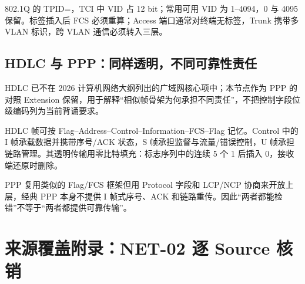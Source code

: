 \documentclass[UTF8,fontset=none,11pt,a4paper]{ctexart}
\begin{document}
802.1Q 的 TPID=，TCI 中 VID 占 12 bit；常用可用 VID 为 1--4094，0 与 4095 保留。标签插入后 FCS 必须重算；Access 端口通常对终端无标签，Trunk 携带多 VLAN 标识，跨 VLAN 通信必须转入三层。

\subsection{HDLC 与 PPP：同样透明，不同可靠性责任}

HDLC 已不在 2026 计算机网络大纲列出的广域网核心项中；本节点作为 PPP 的对照 Extension 保留，用于解释“相似帧骨架为何承担不同责任”，不把控制字段位级编码列为当前背诵要求。

HDLC 帧可按 Flag--Address--Control--Information--FCS--Flag 记忆。Control 中的 I 帧承载数据并携带序号/ACK 状态，S 帧承担监督与流量/错误控制，U 帧承担链路管理。其透明传输用零比特填充：标志序列中的连续 5 个 1 后插入 0，接收端还原时删除。

PPP 复用类似的 Flag/FCS 框架但用 Protocol 字段和 LCP/NCP 协商来开放上层，经典 PPP 本身不提供 I 帧式序号、ACK 和链路重传。因此“两者都能检错”不等于“两者都提供可靠传输”。

\section{来源覆盖附录：NET-02 逐 Source 核销}
\end{document}
